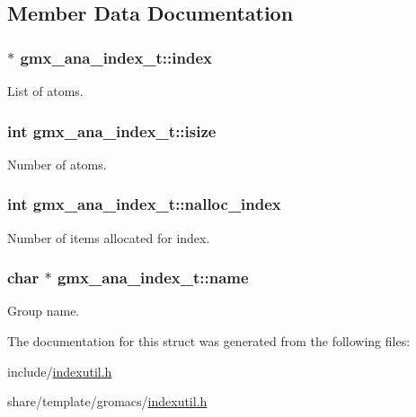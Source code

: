 \subsection{\-Member \-Data \-Documentation}
\hypertarget{structgmx__ana__index__t_ac8e326a1a1c746bf97407622f78e7a38}{
\subsubsection[{index}]{ $\ast$ {\bf gmx\-\_\-ana\-\_\-index\-\_\-t\-::index}}}\label{structgmx__ana__index__t_ac8e326a1a1c746bf97407622f78e7a38}
\-List of atoms. \hypertarget{structgmx__ana__index__t_a0ee0f8838647bdb58ddf24845bfa3895}{
\subsubsection[{isize}]{\setlength{\rightskip}{0pt plus 5cm}int {\bf gmx\-\_\-ana\-\_\-index\-\_\-t\-::isize}}}\label{structgmx__ana__index__t_a0ee0f8838647bdb58ddf24845bfa3895}
\-Number of atoms. \hypertarget{structgmx__ana__index__t_abdf9721c6ce9a94c792dda46cb360fd3}{
\subsubsection[{nalloc\-\_\-index}]{\setlength{\rightskip}{0pt plus 5cm}int {\bf gmx\-\_\-ana\-\_\-index\-\_\-t\-::nalloc\-\_\-index}}}\label{structgmx__ana__index__t_abdf9721c6ce9a94c792dda46cb360fd3}
\-Number of items allocated for {\ttfamily index}. \hypertarget{structgmx__ana__index__t_adc31ad352ddba9fb1eba0fd4aebed5ac}{
\subsubsection[{name}]{\setlength{\rightskip}{0pt plus 5cm}char $\ast$ {\bf gmx\-\_\-ana\-\_\-index\-\_\-t\-::name}}}\label{structgmx__ana__index__t_adc31ad352ddba9fb1eba0fd4aebed5ac}
\-Group name. 

\-The documentation for this struct was generated from the following files\-:\begin{DoxyCompactItemize}
\item 
include/\hyperlink{include_2indexutil_8h}{indexutil.\-h}\item 
share/template/gromacs/\hyperlink{share_2template_2gromacs_2indexutil_8h}{indexutil.\-h}\end{DoxyCompactItemize}
